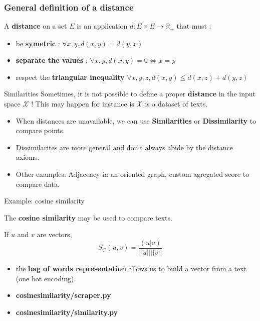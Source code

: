 \documentclass[usenames,dvipsnames]{beamer}
\begin{document}
\begin{frame}
    \frametitle{General definition of a distance}
    A \textbf{distance}  on a set $E$ is an application $d : E\times E \rightarrow \mathbb{R}_+$ that must : 
    \begin{itemize}
	\item be \textbf{symetric} : $\forall x,y, d(x,y)=d(y,x)$
	\item \textbf{separate the values} : $\forall x,y, d(x,y)=0\Leftrightarrow x=y$
	\item	respect the \textbf{triangular inequality} $\forall x,y,z, d(x,y)\leq d(x,z)+d(y,z)$
    \end{itemize}
\end{frame}

\begin{frame}{Similarities}
    Sometimes, it is not possible to define a proper \textbf{distance} in the input space $ \mathcal{X}$ ! This may happen for instance is $ \mathcal{X}$ is a dataset of texts.
    \begin{itemize}
	\item When distances are unavailable, we can use \textbf{{Similarities}} or \textbf{{Dissimilarity}} to compare points.
	\item Dissimilarites are more general and don't always abide by the
	    distance axioms.
	\item Other examples: Adjacency in an oriented graph, custom agregated score to compare data. 
    \end{itemize}
\end{frame}

\begin{frame}{Example: cosine similarity}

    The \textbf{{cosine similarity}} may be used to compare texts.

    If $u$ and $v$ are vectors,
    \begin{equation}
	S_C(u, v) = \frac{(u|v)}{||u|| ||v||} 
    \end{equation}

    \begin{itemize}
	\item the \textbf{{bag of words representation}} allows us to build a vector from a text (one hot encoding).
	\item \textbf{{cosine\textunderscore similarity/scraper.py}} 
	\item \textbf{{cosine\textunderscore similarity/similarity.py}} 
    \end{itemize}
\end{frame}
\end{document}
